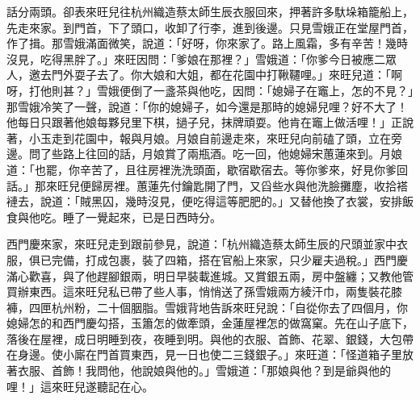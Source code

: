 話分兩頭。卻表來旺兒往杭州織造蔡太師生辰衣服回來，押著許多馱垛箱籠船上，先走來家。到門首，下了頭口，收卸了行李，進到後邊。只見雪娥正在堂屋門首，作了揖。那雪娥滿面微笑，說道：「好呀，你來家了。路上風霜，多有辛苦！幾時沒見，吃得黑胖了。」來旺因問：「爹娘在那裡？」雪娥道：「你爹今日被應二眾人，邀去門外耍子去了。你大娘和大姐，都在花園中打鞦韆哩。」來旺兒道：「啊呀，打他則甚？」雪娥便倒了一盞茶與他吃，因問：「媳婦子在竈上，怎的不見？」那雪娥冷笑了一聲，說道：「你的媳婦子，如今還是那時的媳婦兒哩？好不大了！他每日只跟著他娘每夥兒里下棋，撾子兒，抹牌頑耍。他肯在竈上做活哩！」正說著，小玉走到花園中，報與月娘。月娘自前邊走來，來旺兒向前磕了頭，立在旁邊。問了些路上往回的話，月娘賞了兩瓶酒。吃一回，他媳婦宋蕙蓮來到。月娘道：「也罷，你辛苦了，且往房裡洗洗頭面，歇宿歇宿去。等你爹來，好見你爹回話。」那來旺兒便歸房裡。蕙蓮先付鑰匙開了門，又舀些水與他洗臉攤塵，收拾褡褳去，說道：「賊黑囚，幾時沒見，便吃得這等肥肥的。」又替他換了衣裳，安排飯食與他吃。睡了一覺起來，已是日西時分。

西門慶來家，來旺兒走到跟前參見，說道：「杭州織造蔡太師生辰的尺頭並家中衣服，俱已完備，打成包裹，裝了四箱，搭在官船上來家，只少雇夫過稅。」西門慶滿心歡喜，與了他趕腳銀兩，明日早裝載進城。又賞銀五兩，房中盤纏；又教他管買辦東西。這來旺兒私已帶了些人事，悄悄送了孫雪娥兩方綾汗巾，兩隻裝花膝褲，四匣杭州粉，二十個胭脂。雪娥背地告訴來旺兒說：「自從你去了四個月，你媳婦怎的和西門慶勾搭，玉簫怎的做牽頭，金蓮屋裡怎的做窩窠。先在山子底下，落後在屋裡，成日明睡到夜，夜睡到明。與他的衣服、首飾、花翠、銀錢，大包帶在身邊。使小廝在門首買東西，見一日也使二三錢銀子。」來旺道：「怪道箱子里放著衣服、首飾！我問他，他說娘與他的。」雪娥道：「那娘與他？到是爺與他的哩！」這來旺兒遂聽記在心。

